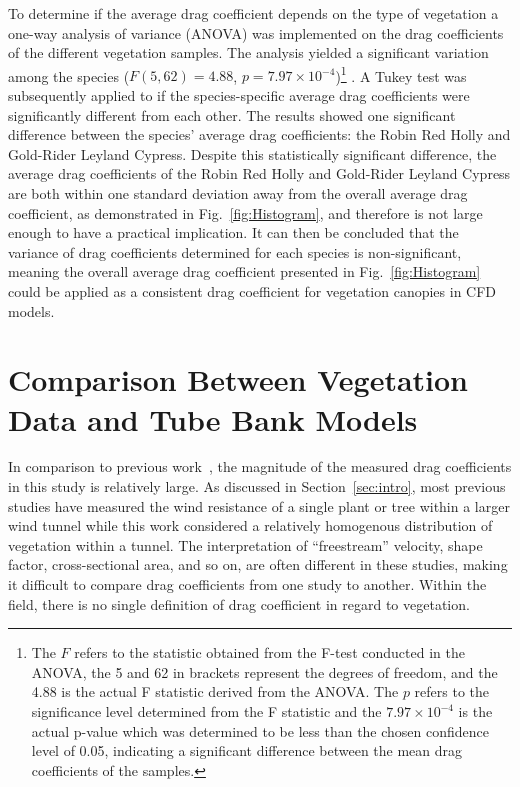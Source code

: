 \documentclass[12pt]{article}
\begin{document}
To determine if the average drag coefficient depends on the type of vegetation a one-way analysis of variance (ANOVA) was implemented on the drag coefficients of the different vegetation samples. The analysis yielded a significant variation among the species ($F(5,62)=4.88$, $p=7.97 \times 10^{-4}$)\footnote{The $F$ refers to the statistic obtained from the F-test conducted in the ANOVA, the 5 and 62 in brackets represent the degrees of freedom, and the 4.88 is the actual F statistic derived from the ANOVA. The $p$ refers to the significance level determined from the F statistic and the $7.97 \times 10^{-4}$ is the actual p-value which was determined to be less than the chosen confidence level of 0.05, indicating a significant difference between the mean drag coefficients of the samples.} . A Tukey test was subsequently applied to if the species-specific average drag coefficients were significantly different from each other. The results showed one significant difference between the species' average drag coefficients: the Robin Red Holly and Gold-Rider Leyland Cypress. Despite this statistically significant difference, the average drag coefficients of the Robin Red Holly and Gold-Rider Leyland Cypress are both within one standard deviation away from the overall average drag coefficient, as demonstrated in Fig.~\ref{fig:Histogram},  and therefore is not large enough to have a practical implication. It can then be concluded that the variance of drag coefficients determined for each species is non-significant, meaning the overall average drag coefficient presented in Fig.~\ref{fig:Histogram} could be applied as a consistent drag coefficient for vegetation canopies in CFD models.

\section{Comparison Between Vegetation Data and Tube Bank Models}
\label{sec:comp}

In comparison to previous work~\cite{Cao2012,Jalonen2014,Mayhead1973,Gillies2002,Ishikawa2006}, the magnitude of the measured drag coefficients in this study is relatively large. As discussed in Section~\ref{sec:intro}, most previous studies have measured the wind resistance of a single plant or tree within a larger wind tunnel while this work considered a relatively homogenous distribution of vegetation within a tunnel. The interpretation of ``freestream'' velocity, shape factor, cross-sectional area, and so on, are often different in these studies, making it difficult to compare drag coefficients from one study to another. Within the field, there is no single definition of drag coefficient in regard to vegetation.
\end{document}

